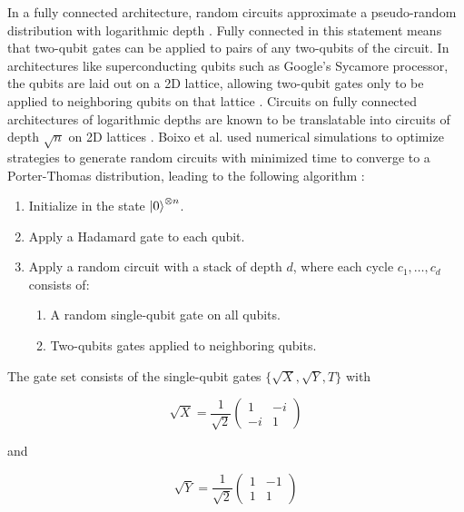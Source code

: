 In a fully connected architecture, random circuits approximate a pseudo-random
distribution with logarithmic depth \cite{harrow2008random}. Fully connected in this statement means
that two-qubit gates can be applied to pairs of any two-qubits of the circuit. In
architectures like superconducting qubits such as Google's Sycamore
processor, the qubits are laid out on a 2D lattice, allowing two-qubit gates only
to be applied to neighboring qubits on that lattice \cite{barends2014logic}. Circuits on fully
connected architectures of logarithmic depths are known to be translatable into
circuits of depth $\sqrt{n}$ on 2D lattices \cite{beals2013efficient}. Boixo et al. used numerical
simulations to optimize strategies to generate random circuits with minimized
time to converge to a Porter-Thomas distribution, leading to the following algorithm \cite{Boixo2018supremacy}:

\begin{enumerate}
  \item Initialize in the state $\Ket{0}^{\otimes n}$.
  \item Apply a Hadamard gate to each qubit.
  \item Apply a random circuit with a stack of depth $d$, where each cycle $c_1,\dots,c_d$ consists of:
    \begin{enumerate}
      \item A random single-qubit gate on all qubits.
        \item Two-qubits gates applied to neighboring qubits.
    \end{enumerate}
\end{enumerate}

The gate set consists of the single-qubit gates $\{\sqrt{X}, \sqrt{Y}, T\}$ with

\begin{equation}
  \sqrt{X} = \frac{1}{\sqrt{2}} \begin{pmatrix}
    1 & - i \\
    - i & 1
    \end{pmatrix}
\end{equation}

and

\begin{equation}
  \sqrt{Y} = \frac{1}{\sqrt{2}} \begin{pmatrix}
    1 & -1  \\
    1 & 1 
  \end{pmatrix}
\end{equation}

